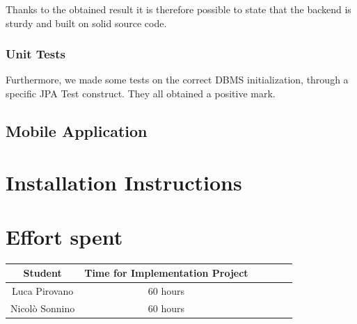 \documentclass[table, 12pt]{article}
\begin{document}
Thanks to the obtained result it is therefore possible to state that the backend is sturdy and built on solid source code.

\subsubsection*{Unit Tests}
Furthermore, we made some tests on the correct DBMS initialization, through a specific JPA Test construct. They all obtained a positive mark.

\subsection{Mobile Application}

\newpage
\section{Installation Instructions}

\section{Effort spent}
\begin{center}
    \begin{tabular}{ | c || c | c | c | c| c|}
        \hline
        Student        & Time for Implementation Project \\ \hline
        Luca Pirovano  & 60 hours                        \\ \hline
        Nicolò Sonnino & 60 hours                              \\
        \hline
    \end{tabular}
\end{center}
\end{document}
